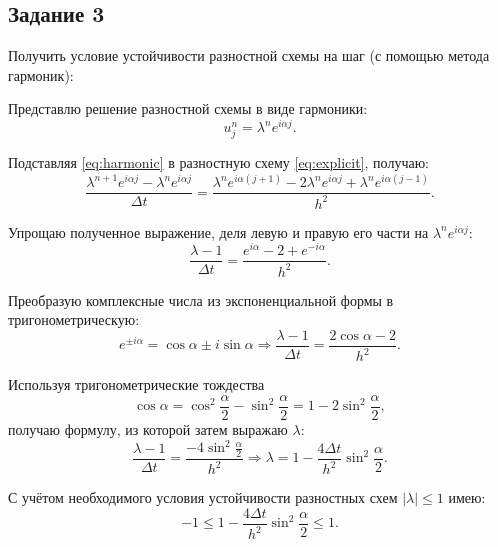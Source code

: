 \documentclass[12pt, a4paper]{report}
\begin{document}
	\subsection*{Задание 3}
	\large
	Получить условие устойчивости разностной схемы на шаг (с помощью метода гармоник): \par
	Представлю решение разностной схемы в виде гармоники:
	\begin{equation}\label{eq:harmonic}
		u_{j}^{n} = \lambda^{n}e^{i \alpha j}.
	\end{equation}
	\par
	Подставляя \eqref{eq:harmonic} в разностную схему \eqref{eq:explicit}, получаю:
	\begin{equation*}
		\frac{\lambda^{n+1}e^{i \alpha j} - \lambda^{n}e^{i \alpha j}}{\Delta t} = \frac{\lambda^{n}e^{i \alpha (j+1)} - 2\lambda^{n}e^{i \alpha j} + \lambda^{n}e^{i \alpha (j-1)}}{h^{2}}.
	\end{equation*}
	\par
	Упрощаю полученное выражение, деля левую и правую его части на $\lambda^{n}e^{i \alpha j}$:
	\begin{equation*}
		\frac{\lambda - 1}{\Delta t} = \frac{e^{i \alpha} - 2 + e^{-i \alpha}}{h^{2}}.
	\end{equation*}
	\par
	Преобразую комплексные числа из экспоненциальной формы в тригонометрическую:
	\begin{equation*}
		e^{\pm i \alpha} = \cos{\alpha} \pm i\sin{\alpha} \Rightarrow \frac{\lambda - 1}{\Delta t} = \frac{2\cos{\alpha} - 2}{h^{2}}.
	\end{equation*}
	\par
	Используя тригонометрические тождества
	\begin{equation*}
		\cos{\alpha} = \cos^{2}{\frac{\alpha}{2}} - \sin^{2}{\frac{\alpha}{2}} = 1 - 2\sin^{2}{\frac{\alpha}{2}},
	\end{equation*}
	получаю формулу, из которой затем выражаю $\lambda$:
	\begin{equation*}
		\frac{\lambda - 1}{\Delta t} = \frac{-4\sin^{2}{\frac{\alpha}{2}}}{h^{2}} \Rightarrow \lambda = 1 - \frac{4 \Delta t}{h^{2}}\sin^{2}{\frac{\alpha}{2}}.
	\end{equation*}
	\par
	С учётом необходимого условия устойчивости разностных схем $\lvert \lambda \rvert \leq 1$ имею:
	\begin{equation*}
		-1 \leq 1 - \frac{4 \Delta t}{h^{2}}\sin^{2}{\frac{\alpha}{2}} \leq 1.
	\end{equation*}
\end{document}
